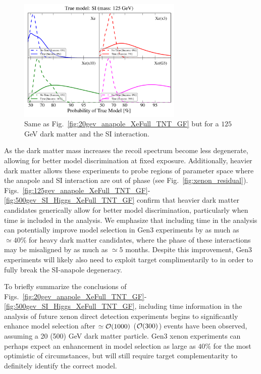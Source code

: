 \documentclass[11pt]{article}
\newcommand{\Fig}[1]{Fig.~\ref{#1}} \newcommand{\Figs}[2]{Figs.~\ref{#1} and \ref{#2}}
\begin{document}
\begin{figure}
\centering
\includegraphics[width=0.7\textwidth]{plots/PDF_125GeV_SI_Higgs_50sims_Xe_Xe3x_Xe10x_XeG3_GF_TNT.pdf}
\caption{\label{fig:125gev_SI_Higgs_XeFull_TNT_GF}
Same as Fig.~\ref{fig:20gev_anapole_XeFull_TNT_GF} but for a $125$ GeV dark matter and the SI interaction.}
\end{figure}


As the dark matter mass increases the recoil spectrum become less degenerate, allowing for better model discrimination at fixed exposure. Additionally, heavier dark matter allows these experiments to probe regions of parameter space where the anapole and SI interaction are out of phase (see \Fig{fig:xenon_residual}). Figs.~\ref{fig:125gev_anapole_XeFull_TNT_GF}-\ref{fig:500gev_SI_Higgs_XeFull_TNT_GF} confirm that heavier dark matter candidates generically allow for better model discrimination, particularly when time is included in the analysis. We emphasize that including time in the analysis can potentially improve model selection in Gen3 experiments by as much as $\simeq 40\%$ for heavy dark matter candidates, where the phase of these interactions may be misaligned by as much as $\simeq 5$ months. Despite this improvement, Gen3 experiments will likely also need to exploit target complimentarily to in order to fully break the SI-anapole degeneracy. 

To briefly summarize the conclusions of Figs.~\ref{fig:20gev_anapole_XeFull_TNT_GF}-\ref{fig:500gev_SI_Higgs_XeFull_TNT_GF}, including time information in the analysis of future xenon direct detection experiments begins to significantly enhance model selection after $\simeq {\cal O}(1000)$ ($ {\cal O}(300)$) events have been observed, assuming a 20 (500) GeV dark matter particle. Gen3 xenon experiments can perhaps expect an enhancement in model selection as large as $40\%$ for the most optimistic of circumstances, but will still require target complementarity to definitely identify the correct model.  
\end{document}
